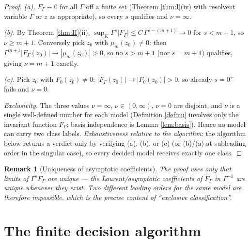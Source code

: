 \documentclass[11pt]{article}
\newtheorem{remark}{Remark}
\begin{document}
\begin{proof}
\emph{(a).} $F_\Gamma\equiv0$ for all $\Gamma$ off a finite set (Theorem
\ref{thm:I}(iv) with resolvent variable $\Gamma$ or $z$ as appropriate), so
every $s$ qualifies and $\nu=\infty$.

\emph{(b).} By Theorem \ref{thm:II}(ii),
$\sup_K\Gamma^s|F_\Gamma|\le C\,\Gamma^{s-(m+1)}\to0$ for $s<m+1$, so
$\nu\ge m+1$. Conversely pick $z_0$ with $\mu_m(z_0)\ne0$: then
$\Gamma^{m+1}|F_\Gamma(z_0)|\to|\mu_m(z_0)|>0$, so no $s>m+1$ (nor $s=m+1$)
qualifies, giving $\nu=m+1$ exactly.

\emph{(c).} Pick $z_0$ with $F_0(z_0)\ne0$: $|F_\Gamma(z_0)|\to|F_0(z_0)|>0$,
so already $s=0^+$ fails and $\nu=0$.

\emph{Exclusivity.} The three values $\nu=\infty$, $\nu\in(0,\infty)$,
$\nu=0$ are disjoint, and $\nu$ is a single well-defined number for each
model (Definition \ref{def:nu} involves only the invariant function
$F_\Gamma$; basis independence is Lemma \ref{lem:basis}). Hence no model can
carry two class labels. \emph{Exhaustiveness relative to the algorithm}: the
algorithm below returns a verdict only by verifying (a), (b), or (c) (or (b)/(a)
at subleading order in the singular case), so every decided model receives
exactly one class.
\end{proof}

\begin{remark}[Uniqueness of asymptotic coefficients]
The proof uses only that limits of $\Gamma^{s}F_\Gamma$ are unique --- the
Laurent/asymptotic coefficients of $F_\Gamma$ in $\Gamma^{-1}$ are unique
whenever they exist. Two different leading orders for the same model are
therefore impossible, which is the precise content of ``exclusive
classification''.
\end{remark}

\section{The finite decision algorithm}
\label{sec:algorithm}
\end{document}
